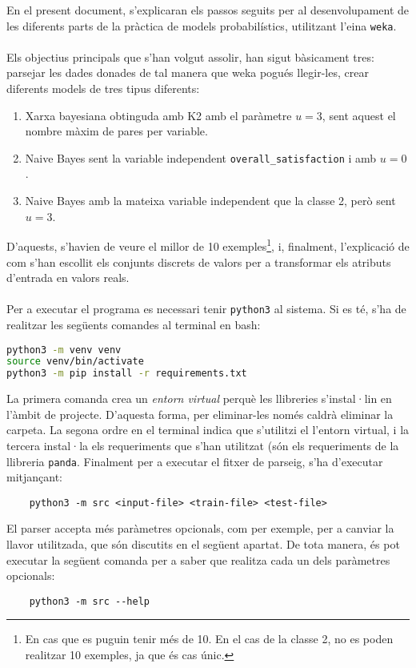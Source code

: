 
En el present document, s'explicaran els passos seguits per al desenvolupament de les diferents parts de la pràctica de models probabilístics, utilitzant l'eina \texttt{weka}.\\\\
Els objectius principals que s'han volgut assolir, han sigut bàsicament tres: parsejar les dades donades de tal manera que weka pogués llegir-les, crear diferents models de tres tipus diferents: 
\begin{enumerate}
	\item Xarxa bayesiana obtinguda amb K2 amb el paràmetre $u=3$, sent aquest el nombre màxim de pares per variable.
	\item Naive Bayes sent la variable independent \texttt{overall\_satisfaction} i amb $u=0$.
	\item Naive Bayes amb la mateixa variable independent que la classe 2, però sent $u=3$.
\end{enumerate}
D'aquests, s'havien de veure el millor de 10 exemples\footnote{En cas que es puguin tenir més de 10. En el cas de la classe 2, no es poden realitzar 10 exemples, ja que és cas únic.}, i, finalment, l'explicació de com s'han escollit els conjunts discrets de valors per a transformar els atributs d'entrada en valors reals.\\
\\
Per a executar el programa es necessari tenir \texttt{python3} al sistema. Si es té,
s'ha de realitzar les següents comandes al terminal en bash:
\begin{lstlisting}[language=bash]
python3 -m venv venv
source venv/bin/activate
python3 -m pip install -r requirements.txt
\end{lstlisting}
La primera comanda crea un \textit{entorn virtual} perquè les llibreries s'instal·lin en l'àmbit de projecte. D'aquesta
forma, per eliminar-les només caldrà eliminar la carpeta. La segona ordre en el terminal 
indica que s'utilitzi el l'entorn virtual, i la tercera instal·la els requeriments que s'han 
utilitzat (són els requeriments de la llibreria \texttt{panda}. Finalment per a executar el fitxer
de parseig, s'ha d'executar mitjançant:
\begin{verbatim}
	python3 -m src <input-file> <train-file> <test-file>
\end{verbatim}
El parser accepta més paràmetres opcionals, com per exemple, per a canviar la llavor utilitzada,
que són discutits en el següent apartat. De tota manera, és pot executar la següent comanda per
a saber que realitza cada un dels paràmetres opcionals:
\begin{verbatim}
	python3 -m src --help
\end{verbatim}

